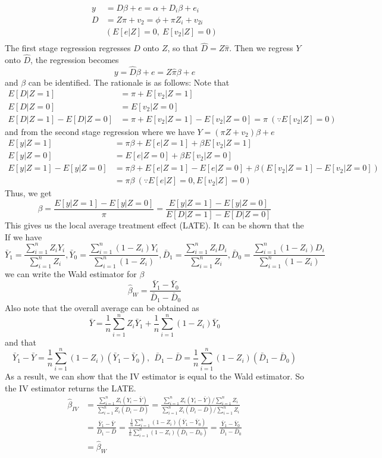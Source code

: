 \documentclass[12pt]{article}
\theoremstyle{definition}
\theoremstyle{property}
\theoremstyle{assumption}
\theoremstyle{example}
\theoremstyle{comment}
\begin{document}
\[
\begin{aligned}
y&=D\beta +e = \alpha+D_i\beta+e_i \\
D&= Z\pi+v_2=\phi+\pi Z_i+v_{2i}\\
&(E[e|Z]=0,\ E[v_{2}|Z]=0)\\
\end{aligned}
\]
The first stage regression regresses $D$ onto $Z$, so that $\widehat{D}=Z\widehat{\pi}$. Then we regress $Y$ onto $\widehat{D}$, the regression becomes
\[
y=\widehat{D}\beta+e = Z\widehat{\pi}\beta+e
\]
and $\beta$ can be identified.  The rationale is as follows: Note that
\[
\begin{aligned}
E[D|Z=1]&=\pi+E[v_{2}|Z=1]\\
E[D|Z=0]&=E[v_{2}|Z=0]\\
E[D|Z=1]-E[D|Z=0]&=\pi+E[v_{2}|Z=1]-E[v_{2}|Z=0]=\pi \ (\because E[v_{2}|Z]=0)
\end{aligned}
\]
and from the second stage regression where we have $Y=(\pi Z+v_2)\beta+e$
\[
\begin{aligned}
E[y|Z=1]&=\pi\beta+E[e|Z=1]+\beta E[v_2|Z=1]\\
E[y|Z=0]&=E[e|Z=0]+\beta E[v_2|Z=0]\\
E[y|Z=1]-E[y|Z=0]&=\pi\beta+E[e|Z=1]-E[e|Z=0] + \beta(E[v_2|Z=1]-E[v_2|Z=0])\\
&=\pi\beta \ (\because E[e|Z]=0, E[v_{2}|Z]=0)
\end{aligned}
\]
Thus, we get
\[
\beta = \frac{E[y|Z=1]-E[y|Z=0]}{\pi} = \frac{E[y|Z=1]-E[y|Z=0]}{E[D|Z=1]-E[D|Z=0]}
\]
This gives us the local average treatment effect (LATE). It can be shown that the If we have
\[
\bar{Y}_1 = \frac{\sum_{i=1}^n Z_iY_i}{\sum_{i=1}^n Z_i}, \bar{Y}_0 = \frac{\sum_{i=1}^n(1- Z_i)Y_i}{\sum_{i=1}^n (1-Z_i)}, 
\bar{D}_1 = \frac{\sum_{i=1}^n Z_iD_i}{\sum_{i=1}^n Z_i}, \bar{D}_0 = \frac{\sum_{i=1}^n(1- Z_i)D_i}{\sum_{i=1}^n (1-Z_i)}
\]
we can write the Wald estimator for $\beta$
\[
\hat{\beta}_W=\frac{\bar{Y}_1-\bar{Y}_0}{\bar{D}_1-\bar{D}_0}
\]
Also note that the overall average can be obtained as
\[
\bar{Y}=\frac{1}{n}\sum_{i=1}^nZ_i\bar{Y}_{1}+\frac{1}{n}\sum_{i=1}^n(1-Z_i)\bar{Y}_{0}
\]
and that 
\[
\bar{Y}_1-\bar{Y}=\frac{1}{n}\sum_{i=1}^n(1-Z_i)(\bar{Y}_1-\bar{Y}_0),\ \ \bar{D}_1-\bar{D}=\frac{1}{n}\sum_{i=1}^n(1-Z_i)(\bar{D}_1-\bar{D}_0)
\]
As a result, we can show that the IV estimator is equal to the Wald estimator. So the IV estimator returns the LATE. 
\[
\begin{aligned}
\hat{\beta}_{IV}&=\frac{\sum_{i=1}^n Z_i(Y_i-\bar{Y})}{\sum_{i=1}^n Z_i(D_i-\bar{D})} =\frac{\sum_{i=1}^n Z_i(Y_i-\bar{Y})/\sum_{i=1}^nZ_i}{\sum_{i=1}^n Z_i(D_i-\bar{D})/\sum_{i=1}^nZ_i} \\
&=\frac{\bar{Y}_1-\bar{Y}}{\bar{D}_1-\bar{D}}=\frac{\frac{1}{n}\sum_{i=1}^n(1-Z_i)(\bar{Y}_1-\bar{Y}_0)}{\frac{1}{n}\sum_{i=1}^n(1-Z_i)(\bar{D}_1-\bar{D}_0)}=\frac{\bar{Y}_1-\bar{Y}_0}{\bar{D}_1-\bar{D}_0}\\
&=\hat{\beta}_W\\
\end{aligned}
\]
\end{document}

